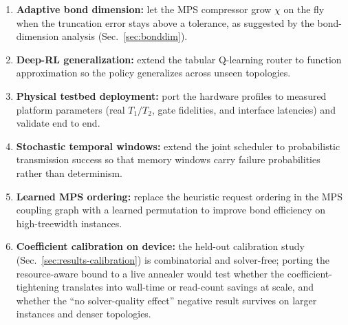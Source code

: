 \documentclass[10pt,a4paper]{article}
\begin{document}
\begin{enumerate}
  \item \textbf{Adaptive bond dimension:} let the MPS compressor grow
    $\chi$ on the fly when the truncation error stays above a
    tolerance, as suggested by the bond-dimension analysis
    (Sec.~\ref{sec:bonddim}).
  \item \textbf{Deep-RL generalization:} extend the tabular
    Q-learning router to function approximation so the policy
    generalizes across unseen topologies.
  \item \textbf{Physical testbed deployment:} port the hardware
    profiles to measured platform parameters (real $T_1/T_2$,
    gate fidelities, and interface latencies) and validate end to end.
  \item \textbf{Stochastic temporal windows:} extend the joint
    scheduler to probabilistic transmission success so that memory
    windows carry failure probabilities rather than determinism.
  \item \textbf{Learned MPS ordering:} replace the heuristic request
    ordering in the MPS coupling graph with a learned permutation to
    improve bond efficiency on high-treewidth instances.
  \item \textbf{Coefficient calibration on device:} the held-out
    calibration study (Sec.~\ref{sec:results-calibration}) is
    combinatorial and solver-free; porting the resource-aware bound to
    a live annealer would test whether the coefficient-tightening
    translates into wall-time or read-count savings at scale, and
    whether the ``no solver-quality effect'' negative result survives
    on larger instances and denser topologies.
\end{enumerate}
\end{document}
